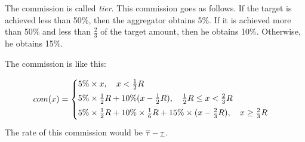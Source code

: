 \documentclass[a4paper]{article}
\begin{document}
The commission is called \emph{tier}. 
This commission goes as follows.
If the target is achieved less than 50\%, then the aggregator obtains 5\%.
If it is achieved more than 50\% and less than $\frac23$ of the target amount, then he obtains 10\%.
Otherwise, he obtains 15\%.

The commission is like this:

\begin{equation}
  com(x) = 
  \begin{cases}
    5\% \times x , \quad x < \frac12 \target \vspace{0.1cm}\\
    5\% \times \frac12 \target + 10\% (x- \frac12 \target), \quad \frac12 \target \le x < \frac23 \target \vspace{0.1cm} \\
    5\% \times \frac12 \target + 10\% \times \frac16 \target + 15 \% \times (x - \frac23 \target), \quad x \ge \frac23 \target \vspace{0.1cm}
  \end{cases}
\end{equation}
The rate of this commission would be $\overline{\tau} - \underline{\tau}$.








\end{document}
